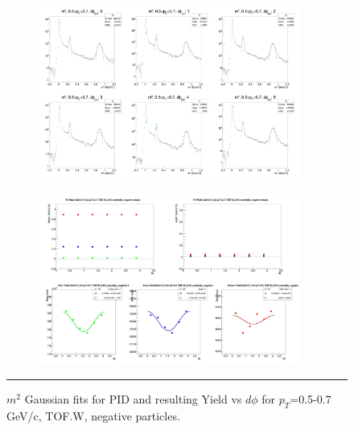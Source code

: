 \begin{figure}[H]
    \begin{subfigure}{1\textwidth}
   \centering
   \includegraphics[width=0.94\textwidth]{lowptfits/yieldvsdphi_tof1_cent0_ch0_pT-5-7.jpg}
    \end{subfigure}
    \begin{subfigure}{1\textwidth}
   \centering
   \includegraphics[width=0.94\textwidth]{lowptfits/fitParams_tof1_cent0_ch0_pT-5-7.jpg}
    \end{subfigure}
    \rule{35em}{0.5pt}
  \caption[PID fits and Yield vs $d\phi$ for $p_T$=0.5-0.7 GeV/c, TOF.W, negative particles. ]{$m^2$ Gaussian fits for PID and resulting Yield vs $d\phi$ for $p_T$=0.5-0.7 GeV/c, TOF.W, negative particles.}
  \label{fig:fits5-7neg}
\end{figure}

